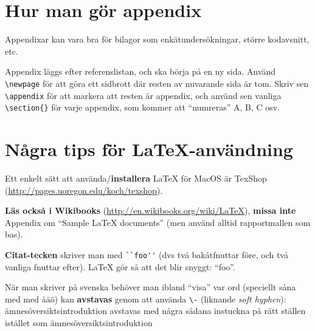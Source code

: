 \documentclass[a4paper,12pt]{article}
\begin{document}
\newpage

%

%


%

\newpage
\appendix %
\iffalse
\section{Hur man gör appendix}
Appendixar kan vara bra för bilagor som enkätundersökningar, större kodavsnitt, etc.

Appendix läggs efter referenslistan, och ska börja på en ny sida. Använd \verb|\newpage| för att göra ett sidbrott där resten av nuvarande sida är tom. Skriv sen \verb|\appendix| för att markera att resten är appendix, och
 använd sen vanliga \verb|\section{}| för varje appendix, som kommer att ``numreras'' A, B, C osv.

\section{Några tips för La\TeX-användning}

Ett enkelt sätt att använda/\textbf{installera} LaTeX för MacOS är TexShop (\url{http://pages.uoregon.edu/koch/texshop}).

\textbf{Läs också i Wikibooks} (\url{http://en.wikibooks.org/wiki/LaTeX}), \textbf{missa inte} Appendix om ``Sample LaTeX documents'' (men använd alltid rapportmallen som bas).

\textbf{Citat-tecken} skriver man med \verb|``foo''| (dvs två bakåtfnuttar före, och två vanliga fnuttar efter). LaTeX gör så att det blir snyggt: ``foo''.

När man skriver på svenska behöver man ibland ``visa'' var ord (speciellt såna med med åäö) kan \textbf{avstavas} genom att använda \verb|\-| (liknande \textit{soft hyphen}): ämnesöversiktsintroduktion avstavas med några sådana instuckna på rätt ställen istället som ämnes\-över\-sikts\-intro\-duk\-tion
\end{document}

